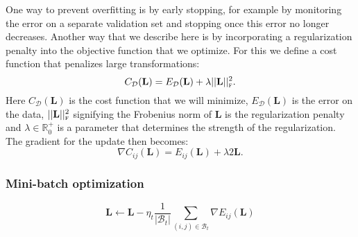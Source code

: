 \documentclass[a4paper,titlepage]{article}
\newcommand{\mat}[1]{\mathbf{#1}}
\begin{document}
One way to prevent overfitting is by early stopping, for example by monitoring the error on a separate validation set and stopping once this error no longer decreases. Another way that we describe here is by incorporating a regularization penalty into the objective function that we optimize. For this we define a cost function that penalizes large transformations:
\begin{equation}
C_{\mathcal{D}}(\mat{L}) =  E_{\mathcal{D}}(\mat{L}) + \lambda ||\mat{L}||_\textsc{f}^2.
\label{eq:structured_risk}
\end{equation}
Here $C_{\mathcal{D}}(\mat{L})$ is the cost function that we will minimize, $E_{\mathcal{D}}(\mat{L})$ is the error on the data, $ ||\mat{L}||_\textsc{f}^2$ signifying the Frobenius norm of $\mat{L}$ is the regularization penalty and $\lambda \in \mathbb{R}_0^+$ is a parameter that determines the strength of the regularization. The gradient for the update then becomes:
\begin{equation}
\nabla C_{ij}(\mat{L}) =  E_{ij}(\mat{L}) + \lambda 2\mat{L}.
\label{eq:structured_grad}
\end{equation}


\subsubsection{Mini-batch optimization}


\begin{equation}
\mat{L} \leftarrow \mat{L} - \eta_{t} \frac{1}{|\mathcal{B}_t|} \sum_{(i,j) \in \mathcal{B}_t} \nabla E_{ij}(\mat{L})
\label{eq:update_batch}
\end{equation}





\end{document}
